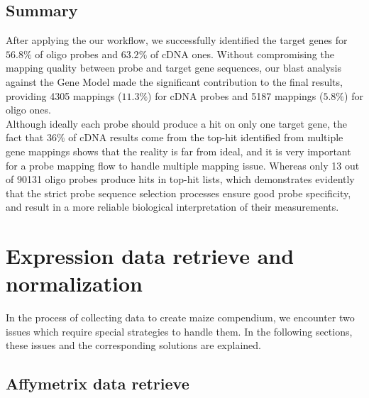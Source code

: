 \subsection*{Summary}

After applying the our workflow, we successfully identified the target genes 
for $56.8\%$ of oligo probes and $63.2\%$ of cDNA ones. 
Without compromising the mapping quality between probe and target gene 
sequences, our blast analysis against the Gene Model made the significant 
contribution to the final results, providing 4305 mappings ($11.3\%$) for cDNA 
probes and 5187 mappings ($5.8\%$) for oligo ones.
\\
Although ideally each probe should produce a hit on only one target 
gene, the fact that $36\%$ of cDNA results come from the top-hit identified 
from multiple gene mappings shows that the reality is far from ideal, and it is 
very important for a probe mapping flow to handle multiple mapping issue. 
Whereas only 13 out of 90131 oligo probes produce hits in top-hit lists, which 
demonstrates evidently that the strict probe sequence selection processes 
ensure good probe specificity, and result in a more reliable biological 
interpretation of their measurements.










\section{Expression data retrieve and normalization}\label{apd:magic-datanorm}

In the process of collecting data to create maize compendium, we encounter two 
issues which require special strategies to handle them. 
In the following sections, these issues and the corresponding solutions are 
explained.

\subsection{Affymetrix data retrieve}

